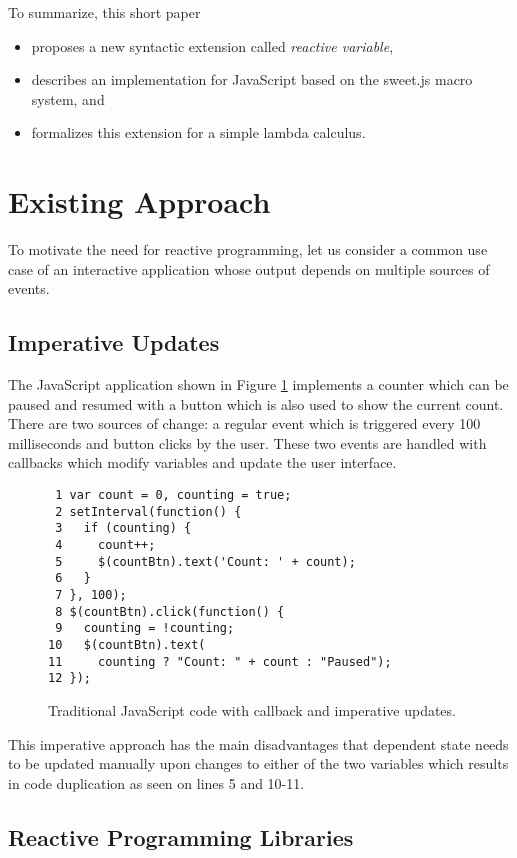 \documentclass{sig-alternate-05-2015}
\begin{document}
To summarize, this short paper

\begin{itemize}
  \item proposes a new syntactic extension called \emph{reactive variable},
  \item describes an implementation for JavaScript based on the sweet.js macro system, and
  \item formalizes this extension for a simple lambda calculus.
\end{itemize}

\section{Existing Approach}

To motivate the need for reactive programming, let us consider a common use case of an interactive application whose output depends on multiple sources of events.

\subsection{Imperative Updates}

The JavaScript application shown in Figure \ref{lst:imperative} implements a counter which can be paused and resumed with a button which is also used to show the current count.  There are two sources of change: a regular event which is triggered every 100 milliseconds and button clicks by the user.  These two events are handled with callbacks which modify variables and update the user interface.

\begin{figure}
  \begin{lstlisting}
 1 var count = 0, counting = true;
 2 setInterval(function() {
 3   if (counting) {
 4     count++;
 5     $(countBtn).text('Count: ' + count);
 6   }
 7 }, 100);
 8 $(countBtn).click(function() {
 9   counting = !counting;
10   $(countBtn).text(
11     counting ? "Count: " + count : "Paused");
12 });\end{lstlisting}
\caption{Traditional JavaScript code with callback and imperative updates.}
\label{lst:imperative}
\end{figure}

This imperative approach has the main disadvantages that dependent state needs to be updated manually upon changes to either of the two variables which results in code duplication as seen on lines 5 and 10-11.

\subsection{Reactive Programming Libraries}
\end{document}
